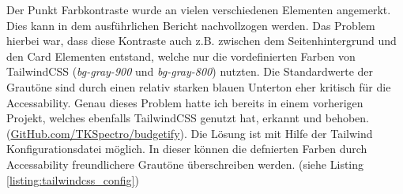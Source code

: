 Der Punkt Farbkontraste wurde an vielen verschiedenen Elementen angemerkt. Dies kann in dem ausführlichen Bericht nachvollzogen werden. Das Problem hierbei war, dass diese Kontraste auch z.B. zwischen dem Seitenhintergrund und den Card Elementen entstand, welche nur die vordefinierten Farben von TailwindCSS (\emph{bg-gray-900} und \emph{bg-gray-800}) nutzten. Die Standardwerte der Grautöne sind durch einen relativ starken blauen Unterton eher kritisch für die Accessability. Genau dieses Problem hatte ich bereits in einem vorherigen Projekt, welches ebenfalls TailwindCSS genutzt hat, erkannt und behoben. (\href{https://github.com/TKSpectro/budgetify}{GitHub.com/TKSpectro/budgetify}). Die Lösung ist mit Hilfe der Tailwind Konfigurationsdatei möglich. In dieser können die defnierten Farben durch Accessability freundlichere Grautöne überschreiben werden. (siehe Listing \ref{listing:tailwindcss_config})